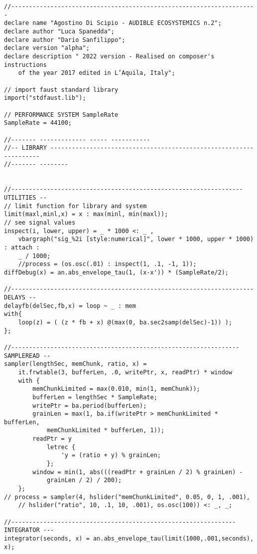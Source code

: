 \vspace{0.5cm}
\begin{lstlisting}
//---------------------------------------------------------------------
declare name "Agostino Di Scipio - AUDIBLE ECOSYSTEMICS n.2";
declare author "Luca Spanedda";
declare author "Dario Sanfilippo";
declare version "alpha";
declare description " 2022 version - Realised on composer's instructions
    of the year 2017 edited in L’Aquila, Italy";

// import faust standard library
import("stdfaust.lib");

// PERFORMANCE SYSTEM SampleRate
SampleRate = 44100;

//------- ------------- ----- -----------
//-- LIBRARY -------------------------------------------------------------------
//------- --------


//----------------------------------------------------------------- UTILITIES --
// limit function for library and system
limit(maxl,minl,x) = x : max(minl, min(maxl));
// see signal values 
inspect(i, lower, upper) = _ * 1000 <: _ , 
    vbargraph("sig_%2i [style:numerical]", lower * 1000, upper * 1000) : attach :
    _ / 1000;
    //process = (os.osc(.01) : inspect(1, .1, -1, 1));
diffDebug(x) = an.abs_envelope_tau(1, (x-x')) * (SampleRate/2);

//-------------------------------------------------------------------- DELAYS --
delayfb(delSec,fb,x) = loop ~ _ : mem
with{ 
    loop(z) = ( (z * fb + x) @(max(0, ba.sec2samp(delSec)-1)) );
};

//---------------------------------------------------------------- SAMPLEREAD --
sampler(lengthSec, memChunk, ratio, x) = 
    it.frwtable(3, bufferLen, .0, writePtr, x, readPtr) * window
    with {
        memChunkLimited = max(0.010, min(1, memChunk));
        bufferLen = lengthSec * SampleRate;
        writePtr = ba.period(bufferLen);
        grainLen = max(1, ba.if(writePtr > memChunkLimited * bufferLen, 
            memChunkLimited * bufferLen, 1));
        readPtr = y
            letrec {
                'y = (ratio + y) % grainLen;
            };
        window = min(1, abs(((readPtr + grainLen / 2) % grainLen) - 
            grainLen / 2) / 200);
    };
// process = sampler(4, hslider("memChunkLimited", 0.05, 0, 1, .001), 
    // hslider("ratio", 10, .1, 10, .001), os.osc(100)) <: _, _;

//--------------------------------------------------------------- INTEGRATOR ---
integrator(seconds, x) = an.abs_envelope_tau(limit(1000,.001,seconds), x);


\end{lstlisting}
